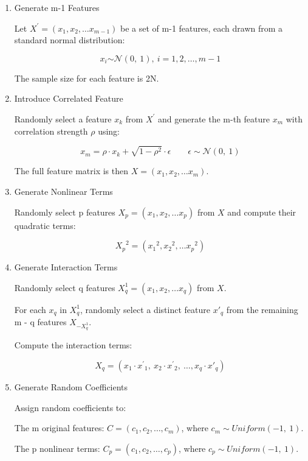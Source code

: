 \documentclass{article}
\begin{document}
\begin{enumerate}
    \item Generate m-1 Features
    
    Let $X^{'} = (x_{1},x_{2},\ldots x_{m - 1})$ be a set of m-1 features, each drawn from a standard normal distribution:
    
    $$x_{i}\mathcal{\sim N}(0,\ 1),\ i = 1,2,\ldots,m - 1$$
    
    The sample size for each feature is 2N.
    
    \item Introduce Correlated Feature
    
    Randomly select a feature $x_{k}$ from $X^{'}$ and generate the m-th feature $x_{m}$ with correlation strength $\rho$ using:
    
    $$x_{m} = \rho \cdot x_{k} + \sqrt{1 - \rho^{2}} \cdot \epsilon \qquad \epsilon\sim\mathcal{N}(0,\ 1)$$
    
    The full feature matrix is then $X = (x_{1},x_{2},\ldots x_{m})$.
    
    \item Generate Nonlinear Terms
    
    Randomly select p features $X_{p} = (x_{1},x_{2},\ldots x_{p})$ from $X$ and compute their quadratic terms:
    
    $${X_{p}}^{2} = ({x_{1}}^{2},{x_{2}}^{2},\ldots{x_{p}}^{2})$$
    
    \item Generate Interaction Terms
    
    Randomly select q features $X_{q}^{1} = (x_{1},x_{2},\ldots x_{q})$ from $X$.
    
    For each $x_{q}$ in $X_{q}^{1}$, randomly select a distinct feature ${x'}_{q}$ from the remaining m - q features $X_{- X_{q}^{1}}$.
    
    Compute the interaction terms:
    
    $$X_{q} = (x_{1} \cdot {x^{'}}_{1},\ x_{2} \cdot {x^{'}}_{2},\ \ldots,x_{q} \cdot {x'}_{q})$$
    
    \item Generate Random Coefficients
    
    Assign random coefficients to:
    
    The m original features: $C = (c_{1},c_{2},\ldots,c_{m})$, where $c_{m}\sim Uniform( - 1,\ 1)$.
    
    The p nonlinear terms: $C_{p} = (c_{1},c_{2},\ldots,c_{p})$, where $c_{p}\sim Uniform( - 1,\ 1)$.
    

\end{enumerate}
\end{document}
